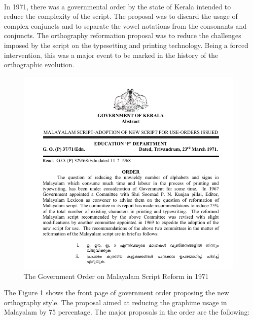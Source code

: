 \documentclass[10pt]{article}
\begin{document}
\paragraph{}
In 1971, there was a governmental order by the state of Kerala intended to reduce the complexity of the script. The proposal was to discard the usage of complex conjuncts and to separate the vowel notations from the consonants and conjuncts.  The orthography  reformation proposal was to reduce the challenges imposed by the script on the typesetting and printing technology. Being a forced intervention, this was a major event to be marked in the history of the orthographic evolution. 

\begin{figure}[h]
  \centering
   \includegraphics[width=\textwidth]{images/1971-gov-script-reformation-order.png}
     \caption{The Government Order on Malayalam Script Reform in 1971}
	\label{go1971}
\end{figure}

The Figure \ref{go1971} shows the front page of government order proposing the new orthography style. The proposal aimed at reducing the graphime usage in Malayalam by 75 percentage. The major proposals in the order are the following:
\end{document}
